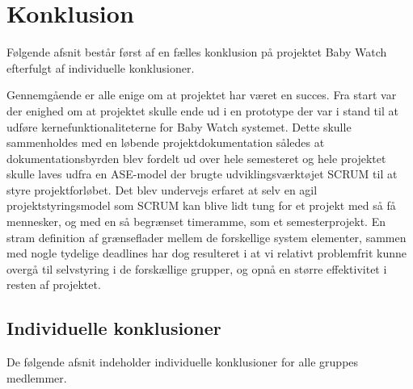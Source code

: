 \chapter{Konklusion}
Følgende afsnit består først af en fælles konklusion på projektet Baby Watch efterfulgt af individuelle konklusioner.

Gennemgående er alle enige om at projektet har været en succes. Fra start var der enighed om at projektet skulle ende ud i en prototype der var i stand til at udføre kernefunktionaliteterne for Baby Watch systemet. Dette skulle sammenholdes med en løbende projektdokumentation således at dokumentationsbyrden blev fordelt ud over hele semesteret og hele projektet skulle laves udfra en ASE-model der brugte udviklingsværktøjet SCRUM til at styre projektforløbet. Det blev undervejs erfaret at selv en agil projektstyringsmodel som SCRUM kan blive lidt tung for et projekt med så få mennesker, og med en så begrænset timeramme, som et semesterprojekt. En stram definition af grænseflader mellem de forskellige system elementer, sammen med nogle tydelige deadlines har dog resulteret i at vi relativt problemfrit kunne overgå til selvstyring i de forskællige grupper, og opnå en større effektivitet i resten af projektet. 


\section{Individuelle konklusioner}

De følgende afsnit indeholder individuelle konklusioner for alle gruppes medlemmer.













